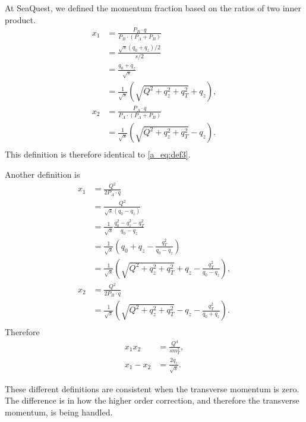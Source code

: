 \documentclass[../main.tex]{subfiles}
\begin{document}
At SeaQuest, we defined the momentum fraction based on the ratios of two inner product.
\begin{equation}
	\begin{split}
		x_1 &= \frac{P_B\cdot q}{P_B\cdot (P_A+P_B)}\\
		&= \frac{\sqrt{s}(q_0+q_z)/2}{s/2}\\
		&= \frac{q_0+q_z}{\sqrt{s}}\\
		&= \frac{1}{\sqrt{s}}\left(\sqrt{Q^2+q_z^2+q_T^2}+q_z\right),\\
		x_2 &= \frac{P_A\cdot q}{P_A\cdot (P_A+P_B)}\\
		&= \frac{1}{\sqrt{s}}\left(\sqrt{Q^2+q_z^2+q_T^2}-q_z\right).\\
	\end{split}
\end{equation}
This definition is therefore identical to \cref{a_eq:def3}.

Another definition is
\begin{equation}
	\begin{split}
		x_1 &= \frac{Q^2}{2P_A \cdot q}\\
		&= \frac{Q^2}{\sqrt{s}(q_0-q_z)}\\
		&= \frac{1}{\sqrt{s}}\frac{q_0^2 -q_z^2 -q_T^2}{q_0-q_z} \\
		&= \frac{1}{\sqrt{s}} \left(q_0+q_z -\frac{q_T^2}{q_0-q_z}\right)\\
		&= \frac{1}{\sqrt{s}}\left(\sqrt{Q^2+q_z^2+q_T^2}+q_z -\frac{q_T^2}{q_0-q_z}\right),\\
		x_2 &= \frac{Q^2}{2P_B \cdot q}\\
		&= \frac{1}{\sqrt{s}}\left(\sqrt{Q^2+q_z^2+q_T^2}-q_z -\frac{q_T^2}{q_0+q_z}\right).\\
	\end{split}
\end{equation}
Therefore
\begin{equation}
	\begin{split}
		x_1x_2 &= \frac{Q^4}{s m_T^2}, \\
		x_1-x_2 &= \frac{2q_z}{\sqrt{s}}.
	\end{split}
\end{equation}

These different definitions are consistent when the transverse momentum is zero.
The difference is in how the higher order correction, and therefore the transverse momentum,
is being handled.
\end{document}
